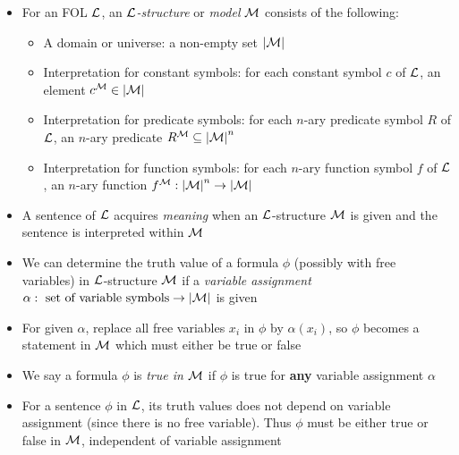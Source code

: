 \begin{itemize}
	
	\item For an FOL $ \mathcal{L} $, an \textit{$ \mathcal{L} $-structure} or \textit{model} $ \mathcal{M} $ consists of the following:
	
	\begin{itemize}
		\item A domain or universe: a non-empty set $ \abs{\mathcal{M}} $
		
		\item Interpretation for constant symbols: for each constant symbol $ c $ of $ \mathcal{L} $, an element $ c^{\mathcal{M}} \in \abs{\mathcal{M}} $
		
		\item Interpretation for predicate symbols: for each $ n $-ary predicate symbol $ R $ of $ \mathcal{L} $, an $ n $-ary predicate $ R^{\mathcal{M}} \subseteq \abs{\mathcal{M}}^n $
		
		\item Interpretation for function symbols: for each $ n $-ary function symbol $ f $ of $ \mathcal{L} $, an $ n $-ary function $ f^{\mathcal{M}}: \abs{\mathcal{M}}^n \to \abs{\mathcal{M}} $
	\end{itemize}

	\item A sentence of $ \mathcal{L} $ acquires \textit{meaning} when an $ \mathcal{L} $-structure $ \mathcal{M} $ is given and the sentence is interpreted within $ \mathcal{M} $
	
	\item We can determine the truth value of a formula $ \phi $ (possibly with free variables) in $ \mathcal{L} $-structure $ \mathcal{M} $ if a \textit{variable assignment} $ \alpha: \text{ set of variable symbols} \to \abs{\mathcal{M}} $ is given
	
	\item For given $ \alpha $, replace all free variables $ x_i $ in $ \phi $ by $ \alpha(x_i) $, so $ \phi $ becomes a statement in $ \mathcal{M} $ which must either be true or false
	
	\item We say a formula $ \phi $ is \textit{true in $ \mathcal{M} $} if $ \phi $ is true for \textbf{any} variable assignment $ \alpha $
	
	\item For a sentence $ \phi $ in $ \mathcal{L} $, its truth values does not depend on variable assignment (since there is no free variable). Thus $ \phi $ must be either true or false in $ \mathcal{M} $, independent of variable assignment
	
\end{itemize}

